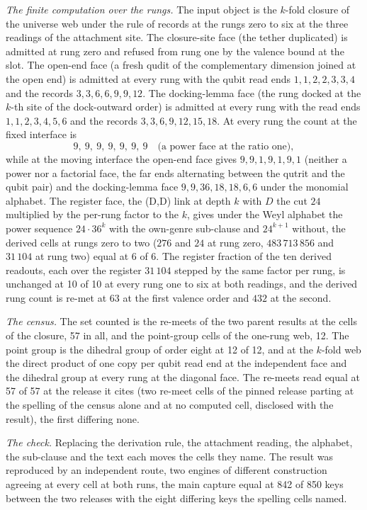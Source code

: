 \begin{chproof}
\textit{The finite computation over the rungs.} The input object is the $k$-fold closure of the universe web under the rule of records at the rungs zero to six at the three readings of the attachment site. The closure-site face (the tether duplicated) is admitted at rung zero and refused from rung one by the valence bound at the slot. The open-end face (a fresh qudit of the complementary dimension joined at the open end) is admitted at every rung with the qubit read ends $1,1,2,2,3,3,4$ and the records $3,3,6,6,9,9,12$. The docking-lemma face (the rung docked at the $k$-th site of the dock-outward order) is admitted at every rung with the read ends $1,1,2,3,4,5,6$ and the records $3,3,6,9,12,15,18$. At every rung the count at the fixed interface is
\begin{equation}
9,\ 9,\ 9,\ 9,\ 9,\ 9,\ 9\quad\text{(a power face at the ratio one)},
\end{equation}
while at the moving interface the open-end face gives $9,9,1,9,1,9,1$ (neither a power nor a factorial face, the far ends alternating between the qutrit and the qubit pair) and the docking-lemma face $9,9,36,18,18,6,6$ under the monomial alphabet. The register face, the (D,D) link at depth $k$ with $D$ the cut $24$ multiplied by the per-rung factor to the $k$, gives under the Weyl alphabet the power sequence $24\cdot 36^{k}$ with the own-genre sub-clause and $24^{k+1}$ without, the derived cells at rungs zero to two ($276$ and $24$ at rung zero, $483\,713\,856$ and $31\,104$ at rung two) equal at 6 of 6. The register fraction of the ten derived readouts, each over the register $31\,104$ stepped by the same factor per rung, is unchanged at 10 of 10 at every rung one to six at both readings, and the derived rung count is re-met at $63$ at the first valence order and $432$ at the second.

\textit{The census.} The set counted is the re-meets of the two parent results at the cells of the closure, 57 in all, and the point-group cells of the one-rung web, 12. The point group is the dihedral group of order eight at 12 of 12, and at the $k$-fold web the direct product of one copy per qubit read end at the independent face and the dihedral group at every rung at the diagonal face. The re-meets read equal at 57 of 57 at the release it cites (two re-meet cells of the pinned release parting at the spelling of the census alone and at no computed cell, disclosed with the result), the first differing none.

\textit{The check.} Replacing the derivation rule, the attachment reading, the alphabet, the sub-clause and the text each moves the cells they name. The result was reproduced by an independent route, two engines of different construction agreeing at every cell at both runs, the main capture equal at 842 of 850 keys between the two releases with the eight differing keys the spelling cells named.
\end{chproof}

